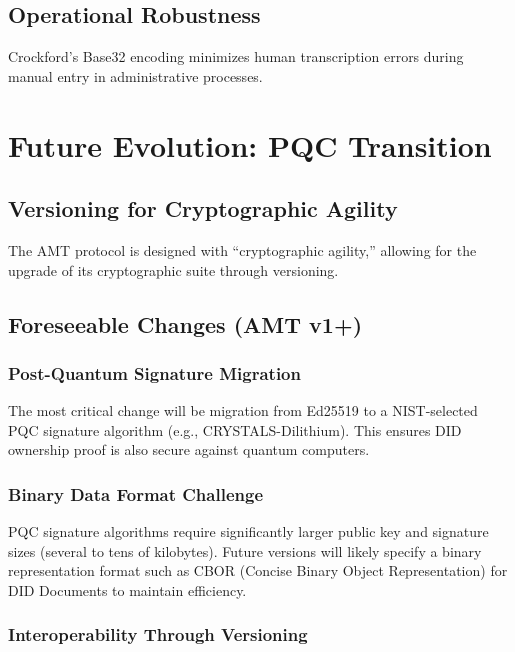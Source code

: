 \subsection{Operational Robustness}

Crockford's Base32 encoding minimizes human transcription errors during manual entry in administrative processes.

\section{Future Evolution: PQC Transition}

\subsection{Versioning for Cryptographic Agility}

The AMT protocol is designed with ``cryptographic agility,'' allowing for the upgrade of its cryptographic suite through versioning.

\subsection{Foreseeable Changes (AMT v1+)}

\subsubsection{Post-Quantum Signature Migration}

The most critical change will be migration from Ed25519 to a NIST-selected PQC signature algorithm (e.g., CRYSTALS-Dilithium). This ensures DID ownership proof is also secure against quantum computers.

\subsubsection{Binary Data Format Challenge}

PQC signature algorithms require significantly larger public key and signature sizes (several to tens of kilobytes). Future versions will likely specify a binary representation format such as CBOR (Concise Binary Object Representation) for DID Documents to maintain efficiency.

\subsubsection{Interoperability Through Versioning}

